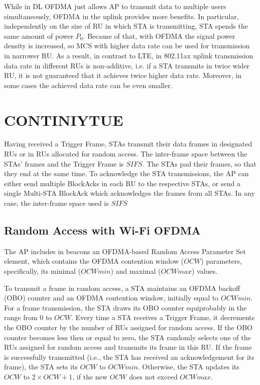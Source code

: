 While in DL OFDMA just allows AP to transmit data to multiple users simultaneously, OFDMA in the uplink provides more benefits. In particular, independently on the size of RU in which STA is transmitting, STA spends the same amount of power $P_0$. Because of that, with OFDMA the signal power density is increased, so MCS with higher data rate can be used for transmission in narrower RU. As a result, in contrast to LTE, in 802.11ax uplink transmission data rate in different RUs is non-additive, i.e. if a STA transmits in twice wider RU, it is not guaranteed that it achieves twice higher data rate. Moreover, in some cases the achieved data rate can be even smaller.

\clearpage
\section{CONTINIYTUE}


Having received a Trigger Frame, STAs transmit their data frames in designated RUs or in RUs allocated for random access.
The inter-frame space between the STAs' frames and the Trigger Frame is $SIFS$.
The STAs pad their frames, so that they end at the same time.
To acknowledge the STA transmissions, the AP can either send multiple BlockAcks in each RU to the respective STAs, or send a single Multi-STA BlockAck which acknowledges the frames from all STAs.
In any case, the inter-frame space used is $SIFS$

\subsection{Random Access with Wi-Fi OFDMA}
The AP includes in beacons an OFDMA-based Random Access Parameter Set element, which contains the OFDMA contention window ($OCW$) parameters, specifically, its minimal ($OCWmin$) and maximal ($OCWmax$) values.

To transmit a frame in random access, a STA maintains an OFDMA backoff (OBO) counter and an OFDMA contention window, initially equal to $OCWmin$.
For a frame transmission, the STA draws its OBO counter equiprobably in the range from $0$ to $OCW$.
Every time a STA receives a Trigger Frame, it decrements the OBO counter by the number of RUs assigned for random access.
If the OBO counter becomes less then or equal to zero, the STA randomly selects one of the RUs assigned for random access and transmits its frame in this RU.
If the frame is successfully transmitted (i.e., the STA has received an acknowledgement for its frame), the STA sets its $OCW$ to $OCWmin$.
Otherwise, the STA updates its $OCW$ to $2 \times OCW + 1$, if the new $OCW$ does not exceed $OCWmax$.

